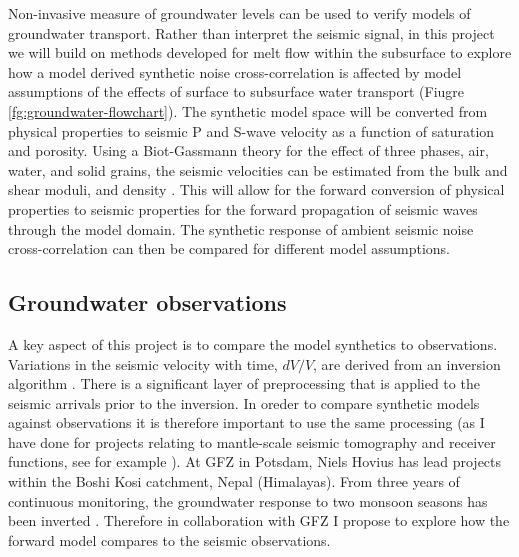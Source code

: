 Non-invasive measure of groundwater levels can be used to verify models of groundwater transport. Rather than interpret the seismic signal, in this project we will build on methods developed for melt flow within the subsurface \citep{franken-etal-2020,armitage-etal-grl-2019} to explore how a model derived synthetic noise cross-correlation is affected by model assumptions of the effects of surface to subsurface water transport (Fiugre \ref{fg:groundwater-flowchart}). The synthetic model space will be converted from physical properties to seismic P and S-wave velocity as a function of saturation and porosity. Using a Biot-Gassmann theory for the effect of three phases, air, water, and solid grains, the seismic velocities can be estimated from the bulk and shear moduli, and density \citep[e.g.][]{rasolofasaon-2012}. This will allow for the forward conversion of physical properties to seismic properties for the forward propagation of seismic waves through the model domain. The synthetic response of ambient seismic noise cross-correlation can then be compared for different model assumptions.

\subsection{Groundwater observations}

A key aspect of this project is to compare the model synthetics to observations. Variations in the seismic velocity with time, $dV/V$, are derived from an inversion algorithm \citep[e.g.][]{lecocq-etal-2017,clements-2018}. There is a significant layer of preprocessing that is applied to the seismic arrivals prior to the inversion. In oreder to compare synthetic models against observations it is therefore important to use the same processing (as I have done for projects relating to mantle-scale seismic tomography and receiver functions, see for example \citealp{goes-etal-2012,armitage-etal-2015,civiero-etal-2019}). At GFZ in Potsdam, Niels Hovius has lead projects within the Boshi Kosi catchment, Nepal (Himalayas). From three years of continuous monitoring, the groundwater response to two monsoon seasons has been inverted \citep{illien-etal-2020}. Therefore in collaboration with GFZ I propose to explore how the forward model compares to the seismic observations.

